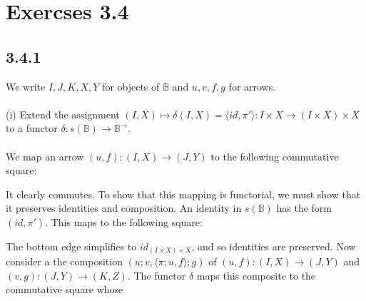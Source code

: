 \documentclass{article}
\begin{document}
\section*{Exercses 3.4}

\subsection*{3.4.1}

We write $I,J,K,X,Y$ for objects of $\mathbb B$ and $u,v,f,g$ for arrows.\\~\\
(i) Extend the assignment $(I,X) \mapsto \delta(I,X) = \langle id, \pi' \rangle : I \times X \to (I \times X) \times X$
to a functor $\delta : s(\mathbb B) \to \mathbb B^{\to}$.\\~\\
We map an arrow $(u,f) : (I,X) \to (J,Y)$ to the following commutative square:
\begin{center}
\end{center}
It clearly commutes. To show that this mapping is functorial, we must show that it preserves identities and composition.
An identity in $s(\mathbb B)$ has the form $(id, \pi')$. This maps to the following square:
\begin{center}
\end{center}
The bottom edge simplifies to $id_{(I \times X) \times X}$, and so identities are preserved.
Now consider a the composition $(u;v, \langle \pi;u , f \rangle; g)$ of $(u,f) : (I,X) \to (J, Y)$ 
and $(v,g) : (J, Y) \to (K,Z)$. The functor $\delta$ maps this composite to the commutative square whose 
\end{document}
